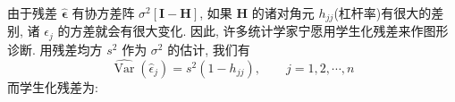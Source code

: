 由于残差 $\hat{\boldsymbol{\epsilon}}$ 有协方差阵 $\sigma^2[\mathbf{I}-\mathbf{H}]$, 如果 $\mathbf{H}$ 的诸对角元 $h_{jj}$(杠杆率)有很大的差别, 诸 $\epsilon_j$ 的方差就会有很大变化. 因此, 许多统计学家宁愿用学生化残差来作图形诊断. 用残差均方 $s^2$ 作为 $\sigma^2$ 的估计, 我们有
\label{eq:7-17}
\begin{equation}
\widehat{\operatorname{Var}}(\hat{\epsilon}_j)=s^2(1-h_{jj}),\qquad j=1,2,\cdots,n \tag{7-17}
\end{equation}
而学生化残差为:
